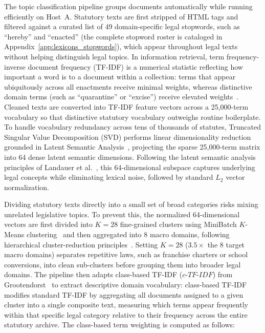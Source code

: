        The topic classification pipeline groups documents automatically while running efficiently on Host~A. Statutory texts are first stripped of HTML tags and filtered against a curated list of 49 domain-specific legal stopwords, such as ``hereby'' and ``enacted'' (the complete stopword roster is cataloged in Appendix~\ref{app:lexicons_stopwords}), which appear throughout legal texts without helping distinguish legal topics. In information retrieval, term frequency-inverse document frequency (TF-IDF) is a numerical statistic reflecting how important a word is to a document within a collection: terms that appear ubiquitously across all enactments receive minimal weights, whereas distinctive domain terms (such as ``quarantine'' or ``excise'') receive elevated weights~\cite{manning2008introduction}. Cleaned texts are converted into TF-IDF feature vectors across a 25,000-term vocabulary so that distinctive statutory vocabulary outweighs routine boilerplate. To handle vocabulary redundancy across tens of thousands of statutes, Truncated Singular Value Decomposition (SVD) performs linear dimensionality reduction grounded in Latent Semantic Analysis~\cite{deerwester1990indexing}, projecting the sparse 25,000-term matrix into 64 dense latent semantic dimensions. Following the latent semantic analysis principles of Landauer et al.~\cite{landauer1998introduction}, this 64-dimensional subspace captures underlying legal concepts while eliminating lexical noise, followed by standard $L_2$ vector normalization.

        Dividing statutory texts directly into a small set of broad categories risks mixing unrelated legislative topics. To prevent this, the normalized 64-dimensional vectors are first divided into $K = 28$ fine-grained clusters using MiniBatch $K$-Means clustering~\cite{sculley2010webscale} and then aggregated into 8 macro domains, following hierarchical cluster-reduction principles~\cite{aggarwal2012mining, grootendorst2022bertopic}. Setting $K = 28$ ($3.5\times$ the 8 target macro domains) separates repetitive laws, such as franchise charters or school conversions, into clean sub-clusters before grouping them into broader legal domains. The pipeline then adapts class-based TF-IDF ($c\text{-}TF\text{-}IDF$) from Grootendorst~\cite{grootendorst2022bertopic} to extract descriptive domain vocabulary: class-based TF-IDF modifies standard TF-IDF by aggregating all documents assigned to a given cluster into a single composite text, measuring which terms appear frequently within that specific legal category relative to their frequency across the entire statutory archive. The class-based term weighting is computed as follows:

